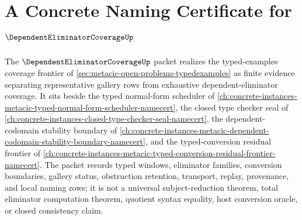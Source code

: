 \chapter{A Concrete Naming Certificate for $\DependentEliminatorCoverageUp$}
\label{ch:concrete-instances-dependent-eliminator-coverage-namecert}

The $\DependentEliminatorCoverageUp$ packet realizes the typed-examples coverage frontier of \autoref{sec:metacic-open-problems-typedexamples} as finite evidence separating representative gallery rows from exhaustive dependent-eliminator coverage. It sits beside the typed normal-form scheduler of \autoref{ch:concrete-instances-metacic-typed-normal-form-scheduler-namecert}, the closed type checker seal of \autoref{ch:concrete-instances-closed-type-checker-seal-namecert}, the dependent-codomain stability boundary of \autoref{ch:concrete-instances-metacic-dependent-codomain-stability-boundary-namecert}, and the typed-conversion residual frontier of \autoref{ch:concrete-instances-metacic-typed-conversion-residual-frontier-namecert}. The packet records typed windows, eliminator families, conversion boundaries, gallery status, obstruction retention, transport, replay, provenance, and local naming rows; it is not a universal subject-reduction theorem, total eliminator computation theorem, quotient syntax equality, host conversion oracle, or closed consistency claim.

